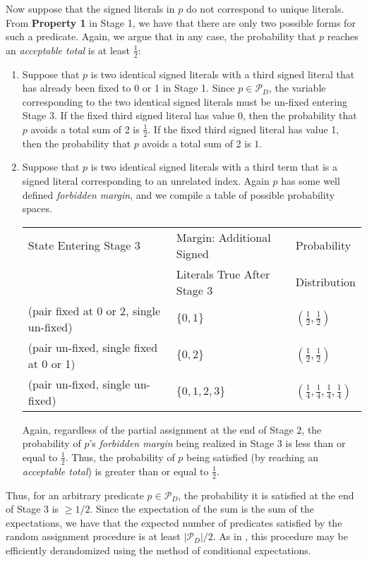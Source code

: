 \documentclass{article}
\begin{document}
Now suppose that the signed literals in $p$ do not correspond to unique literals. From \textbf{Property 1} in Stage 1, we have that there are only two possible forms for such a predicate. Again, we argue that in any case, the probability that $p$ reaches an \textit{acceptable total} is at least $\frac{1}{2}$:
\begin{enumerate}
\item Suppose that $p$ is two identical signed literals with a third signed literal that has already been fixed to 0 or 1 in Stage 1. Since $p\in\mathcal{P}_D$, the variable corresponding to the two identical signed literals must be un-fixed entering Stage 3. If the fixed third signed literal has value 0, then the probability that $p$ avoids a total sum of 2 is $\frac{1}{2}$. If the fixed third signed literal has value 1, then the probability that $p$ avoids a total sum of 2 is $1$.


\item Suppose that $p$ is two identical signed literals with a third term that is a signed literal corresponding to an unrelated index. Again $p$ has some well defined \textit{forbidden margin}, and we compile a table of possible probability spaces.


\begin{tabular}{|l|l|l|} \hline
State Entering Stage 3 & Margin: Additional Signed  & Probability  \\
 & Literals True After Stage 3& Distribution  \\
\hline
(pair fixed at 0 or 2, single un-fixed)& $\{0,1\}$&$(\frac{1}{2},\frac{1}{2})$\\  
\hline
(pair un-fixed, single fixed at 0 or 1) & $\{0,2\}$& $(\frac{1}{2},\frac{1}{2})$\\ 
\hline
(pair un-fixed, single un-fixed) & $\{0,1,2,3\}$& $(\frac{1}{4},\frac{1}{4},\frac{1}{4},\frac{1}{4} )$\\ 
\hline
\end{tabular}

Again, regardless of the partial assignment at the end of Stage 2, the probability of $p$'s \textit{forbidden margin} being realized in Stage 3 is less than or equal to $\frac{1}{2}$. Thus, the probability of $p$ being satisfied (by reaching an \textit{acceptable total}) is greater than or equal to $\frac{1}{2}$.
\end{enumerate}

Thus, for an arbitrary predicate $p\in \mathcal{P}_D$, the probability it is satisfied at the end of Stage 3 is $\geq 1/2$. Since the expectation of the sum is the sum of the expectations, we have that the expected number of predicates satisfied by the random assignment procedure is at least $|\mathcal{P}_D|/2$. As in \citep{RS}, this procedure may be efficiently derandomized using the method of conditional expectations.
\end{document}

